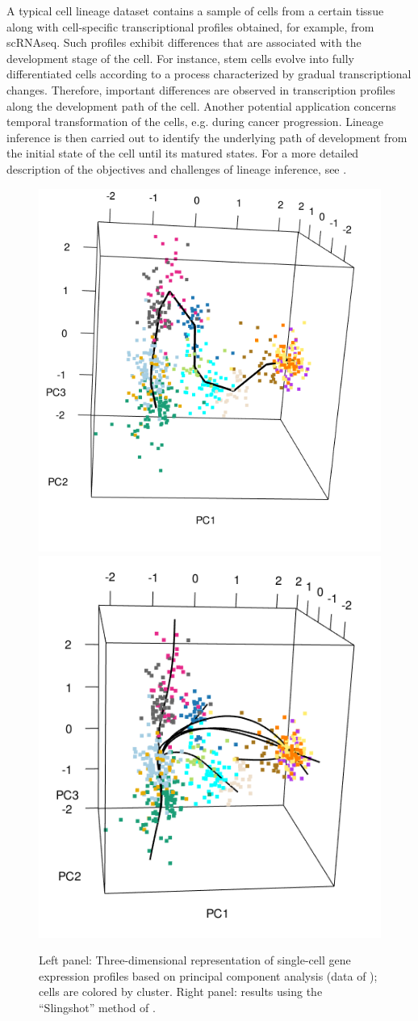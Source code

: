 A typical cell lineage dataset contains a sample of cells from a certain tissue along with cell-specific transcriptional profiles obtained, for example, from scRNAseq. 
Such profiles exhibit differences that are associated with the development stage of the cell. 
For instance, stem cells evolve into fully differentiated cells according to a process characterized by gradual transcriptional changes. Therefore, important differences are observed in transcription profiles along the development path of the cell. 
Another potential application concerns temporal transformation of the cells, e.g. during cancer progression. 
Lineage inference is then carried out to identify the underlying path of development from the initial state of the cell until its matured states. 
For a more detailed description of the objectives and challenges of lineage inference, see \cite{korthauer2016statistical} .




\begin{figure}[!ht]
	\centering
	\includegraphics[width=.4\linewidth]{./Img/fletcher/fletcher_data_3d.png}
	\includegraphics[width=.4\linewidth]{./Img/fletcher/fletcher_data_slingshot.png}	
	\caption{Left panel: Three-dimensional representation of single-cell gene expression profiles based on principal component analysis (data of \cite{fletcher2017deconstructing}); cells are colored by cluster. Right panel: results using the ``Slingshot'' method of \cite{street2018}.}
	\label{fig:ex_data}
\end{figure}

